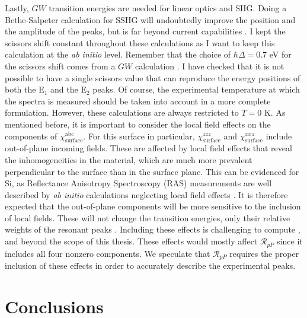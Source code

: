 Lastly, $GW$ transition energies are needed for linear optics and SHG. Doing a
Bethe-Salpeter calculation for SSHG will undoubtedly improve the position and
the amplitude of the peaks, but is far beyond current capabilities \cite{puff}.
I kept the scissors shift constant throughout these calculations as I want to
keep this calculation at the {\em ab initio} level. Remember that the choice of
$\hbar\Delta=0.7$ eV for the scissors shift comes from a $GW$ calculation
\cite{liPRB10}. I have checked that it is not possible to have a single scissors
value that can reproduce the energy positions of both the E$_{1}$ and the
E$_{2}$ peaks. Of course, the experimental temperature at which the spectra is
measured should be taken into account in a more complete formulation. However,
these calculations are always restricted to $T=0$ K. As mentioned before, it is
important to consider the local field effects on the components of
$\chi^{\mathrm{abc}}_{\mathrm{surface}}$. For this surface in particular,
$\chi^{zzz}_{\mathrm{surface}}$ and $\chi^{xxz}_{\mathrm{surface}}$ include
out-of-plane incoming fields. These are affected by local field effects
\cite{tancognedejean:tel-01235611} that reveal the inhomogeneities in the
material, which are much more prevalent perpendicular to the surface than in the
surface plane. This can be evidenced for Si, as Reflectance Anisotropy
Spectroscopy (RAS) measurements are well described by \emph{ab initio}
calculations neglecting local field effects \cite{palummoPRB99, gaalPRB09}. It
is therefore expected that the out-of-plane components will be more sensitive to
the inclusion of local fields. These will not change the transition energies,
only their relative weights of the resonant peaks
\cite{tancognedejean:tel-01235611}. Including these effects is challenging to
compute \cite{nicolasPRB15}, and beyond the scope of this thesis. These effects
would mostly affect $\mathcal{R}_{pP}$ since it includes all four nonzero
components. We speculate that $\mathcal{R}_{pP}$ requires the proper inclusion
of these effects in order to accurately describe the experimental peaks.



\section{Conclusions}

